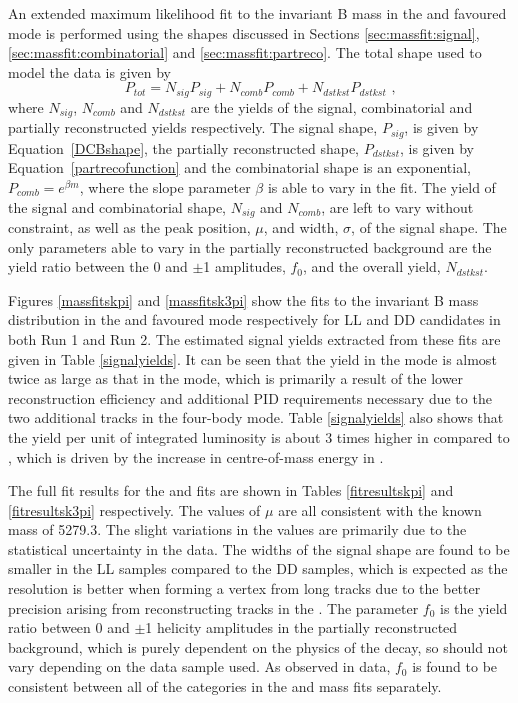 An extended maximum likelihood fit to the invariant B mass in the \kpi and \kpipipi favoured mode is performed using the shapes discussed in Sections \ref{sec:massfit:signal}, \ref{sec:massfit:combinatorial} and \ref{sec:massfit:partreco}. The total shape used to model the data is given by
\begin{equation}
P_{tot} = N_{sig}P_{sig} + N_{comb}P_{comb} + N_{dstkst}P_{dstkst} \text{ ,}
\label{totalpdf}
\end{equation}
where $N_{sig}$, $N_{comb}$ and $N_{dstkst}$ are the yields of the signal, combinatorial and partially reconstructed yields respectively. The signal shape, $P_{sig}$, is given by Equation~\ref{DCBshape}, the partially reconstructed shape, $P_{dstkst}$, is given by Equation~\ref{partrecofunction} and the combinatorial shape is an exponential, $P_{comb} = e^{\beta m}$, where the slope parameter $\beta$ is able to vary in the fit. The yield of the signal and combinatorial shape, $N_{sig}$ and $N_{comb}$, are left to vary without constraint, as well as the peak position, $\mu$, and width, $\sigma$, of the signal shape. The only parameters able to vary in the partially reconstructed background are the yield ratio between the 0 and $\pm$1 amplitudes, $f_0$, and the overall yield, $N_{dstkst}$.

Figures \ref{massfitskpi} and \ref{massfitsk3pi} show the fits to the invariant B mass distribution in the \kpi and \kpipipi favoured mode respectively for LL and DD candidates in both Run 1 and Run 2. The estimated signal yields extracted from these fits are given in Table \ref{signalyields}. It can be seen that the yield in the \kpi mode is almost twice as large as that in the \kpipipi mode, which is primarily a result of the lower reconstruction efficiency and additional PID requirements necessary due to the two additional tracks in the four-body mode. Table \ref{signalyields} also shows that the yield per unit of integrated luminosity is about 3 times higher in \runone compared to \runtwo, which is driven by the increase in centre-of-mass energy in \runtwo.

The full fit results for the \kpi and \kpipipi fits are shown in Tables \ref{fitresultskpi} and \ref{fitresultsk3pi} respectively. The values of $\mu$ are all consistent with the known \Bm mass of 5279.3\mevcc. The slight variations in the values are primarily due to the statistical uncertainty in the data. The widths of the signal shape are found to be smaller in the LL samples compared to the DD samples, which is expected as the resolution is better when forming a vertex from long tracks due to the better precision arising from reconstructing tracks in the \velo. The parameter $f_0$ is the yield ratio between 0 and $\pm$1 helicity amplitudes in the partially reconstructed background, which is purely dependent on the physics of the decay, so should not vary depending on the data sample used. As observed in data, $f_0$ is found to be consistent between all of the categories in the \kpi and \kpipipi mass fits separately.


